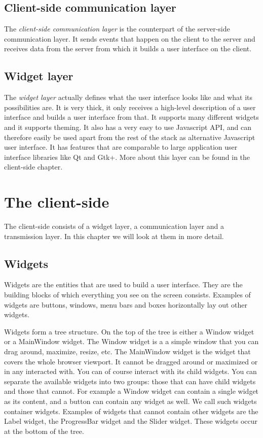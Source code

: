 \documentclass[11pt]{article}
\begin{document}
\subsection{Client-side communication layer}

The \textit{client-side communication layer} is the counterpart of the server-side communication layer.
It sends events that happen on the client to the server and receives data from the server from which it builds a user interface on the client.

\subsection{Widget layer}

The \textit{widget layer} actually defines what the user interface looks like and what its possibilities are.
It is very thick, it only receives a high-level description of a user interface and builds a user interface from that.
It supports many different widgets and it supports theming.
It also has a very easy to use Javascript API, and can therefore easily be used apart from the rest of the stack as alternative Javascript user interface.
It has features that are comparable to large application user interface libraries like Qt and Gtk+.
More about this layer can be found in the client-side chapter.

\newpage
\section{The client-side}

The client-side consists of a widget layer, a communication layer and a transmission layer.
In this chapter we will look at them in more detail.

\subsection{Widgets}

Widgets are the entities that are used to build a user interface.
They are the building blocks of which everything you see on the screen consists.
Examples of widgets are buttons, windows, menu bars and boxes horizontally lay out other widgets.

Widgets form a tree structure.
On the top of the tree is either a Window widget or a MainWindow widget.
The Window widget is a a simple window that you can drag around, maximize, resize, etc.
The MainWindow widget is the widget that covers the whole browser viewport.
It cannot be dragged around or maximized or in any interacted with.
You can of course interact with its child widgets.
You can separate the available widgets into two groups: those that can have child widgets and those that cannot.
For example a Window widget can contain a single widget as its content, and a button can contain any widget as well.
We call such widgets container widgets.
Examples of widgets that cannot contain other widgets are the Label widget, the ProgressBar widget and the Slider widget.
These widgets occur at the bottom of the tree.
\end{document}

